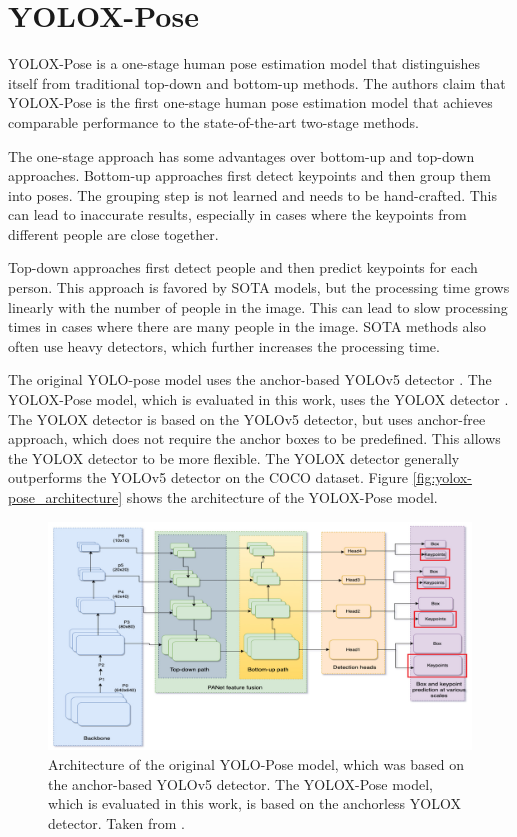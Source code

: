 \section{YOLOX-Pose}
\label{yolox-pose}

YOLOX-Pose  is a one-stage human pose estimation model that distinguishes itself from traditional top-down and bottom-up methods. The authors claim that YOLOX-Pose is the first one-stage human pose estimation model that achieves comparable performance to the state-of-the-art two-stage methods.

The one-stage approach has some advantages over bottom-up and top-down approaches. Bottom-up approaches first detect keypoints and then group them into poses. The grouping step is not learned and needs to be hand-crafted. This can lead to inaccurate results, especially in cases where the keypoints from different people are close together.

Top-down approaches first detect people and then predict keypoints for each person. This approach is favored by SOTA models, but the processing time grows linearly with the number of people in the image. This can lead to slow processing times in cases where there are many people in the image. SOTA methods also often use heavy detectors, which further increases the processing time.



The original YOLO-pose \cite{yoloPose} model uses the anchor-based YOLOv5 detector \cite{yolov5}. The YOLOX-Pose model, which is evaluated in this work, uses the YOLOX detector \cite{yolox}. The YOLOX detector is based on the YOLOv5 detector, but uses anchor-free approach, which does not require the anchor boxes to be predefined. This allows the YOLOX detector to be more flexible. The YOLOX detector generally outperforms the YOLOv5 detector on the COCO dataset. Figure \ref{fig:yolox-pose_architecture} shows the architecture of the YOLOX-Pose model.

\begin{figure}[htbp]
    \centering
    \includegraphics[width=\textwidth]{obrazky-figures/yolopose_architecture.png}
    \caption{Architecture of the original YOLO-Pose model, which was based on the anchor-based YOLOv5 detector. The YOLOX-Pose model, which is evaluated in this work, is based on the anchorless YOLOX detector. Taken from \cite{yoloPose}.}
    \label{fig:yolopose_architecture}
\end{figure}

